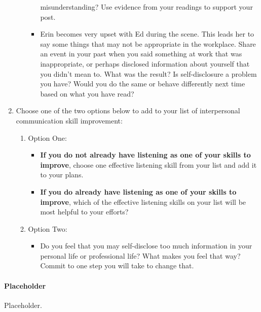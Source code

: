 \documentclass[stu,12pt]{apa7}
\begin{document}
\begin{enumerate}
\begin{itemize}
\begin{itemize}
                  misunderstanding? Use evidence from your readings to support
                  your post.
                \item Erin becomes very upset with Ed during the scene. This
                  leads her to say some things that may not be appropriate in
                  the workplace. Share an event in your past when you said
                  something at work that was inappropriate, or perhaps disclosed
                  information about yourself that you didn’t mean to. What was
                  the result? Is self-disclosure a problem you have? Would you
                  do the same or behave differently next time based on what you
                  have read?
              \end{itemize}
          \end{itemize}
        \item Choose one of the two options below to add to your list of
          interpersonal communication skill improvement:
          \begin{enumerate}
            \item Option One:
              \begin{itemize}
                \item \textbf{If you do not already have listening as one of
                  your skills to improve}, choose one effective listening skill
                  from your list and add it to your plans.
                \item \textbf{If you do already have listening as one of your
                  skills to improve}, which of the effective listening skills
                  on your list will be most helpful to your efforts?
              \end{itemize}
            \item Option Two:
              \begin{itemize}
                \item Do you feel that you may self-disclose too much
                  information in your personal life or professional life? What
                  makes you feel that way? Commit to one step you will take to
                  change that.
              \end{itemize}
          \end{enumerate}
      \end{enumerate}


    \newpage
    \paragraph{Placeholder}
      Placeholder.



\end{document}
